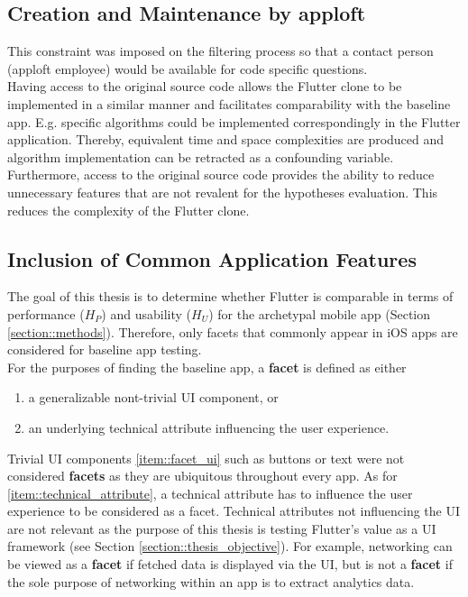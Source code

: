 \subsection*{Creation and Maintenance by apploft}
This constraint was imposed on the filtering process so that a contact person (apploft
employee) would be available for code specific questions.\\
Having access to the original source code allows the Flutter clone to be implemented in a similar manner and facilitates comparability with the baseline app.
E.g. specific algorithms could be implemented correspondingly in the Flutter application. Thereby, equivalent time and space complexities are produced and 
algorithm implementation can be retracted as a confounding variable.\\
Furthermore, access to the original source code provides the ability to reduce unnecessary features that are not revalent for the hypotheses evaluation. This reduces the complexity of the Flutter clone.

\subsection*{Inclusion of Common Application Features}
The goal of this thesis is to determine whether Flutter is comparable in terms of performance ($H_P$) and usability ($H_U$) for the archetypal mobile app (Section \ref{section::methods}). 
Therefore, only facets that commonly appear in iOS apps are considered for baseline app testing.\\
For the purposes of finding the baseline app, a \textbf{facet} is defined as either
\begin{enumerate}[label=(\alph*)]
    \item a generalizable nont-trivial UI component, or \label{item::facet_ui}
    \item an underlying technical attribute influencing the user experience. \label{item::technical_attribute}
\end{enumerate}

Trivial UI components \ref{item::facet_ui} such as buttons or text were not considered \textbf{facets} as they are ubiquitous throughout every app.
As for \ref{item::technical_attribute}, a technical attribute has to influence the user experience to be considered as a facet.
Technical attributes not influencing the UI are not relevant as the purpose of this thesis is testing Flutter's value as a UI framework (see Section \ref{section::thesis_objective}).
For example, networking can be viewed as a \textbf{facet} if fetched data is displayed via the UI, but is not a \textbf{facet} if the sole purpose of networking within 
an app is to extract analytics data.

